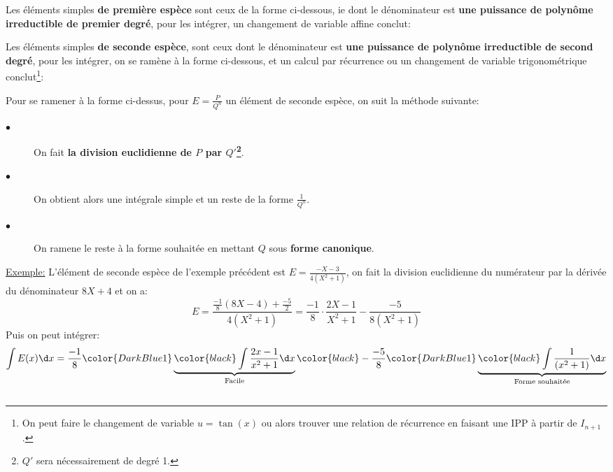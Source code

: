 Les éléments simples \textbf{de première espèce} sont ceux de la forme ci-dessous, ie dont le dénominateur est \textbf{une puissance de polynôme irreductible de premier degré}, pour les intégrer, un changement de variable affine conclut:

Les éléments simples \textbf{de seconde espèce}, sont ceux dont le dénominateur est \textbf{une puissance de polynôme irreductible de second degré}, pour les intégrer, on se ramène à la forme ci-dessous, et un calcul par récurrence ou un changement de variable trigonométrique conclut\footnote[1]{On peut faire le changement de variable \(u = \tan(x)\) ou alors trouver une relation de récurrence en faisant une IPP à partir de \(I_{n+1}\).}:

Pour se ramener à la forme ci-dessus, pour \(E = \frac{P}{Q^n}\) un élément de seconde espèce, on suit la méthode suivante:\+
\begin{description}
   \item[$\bullet$] On fait \textbf{la division euclidienne de \(P\) par \(Q'\)\footnote[2]{\(Q'\) sera nécessairement de degré 1.}}.
   \item[$\bullet$] On obtient alors une intégrale simple et un reste de la forme \(\frac{1}{Q^n}\).
   \item[$\bullet$] On ramene le reste à la forme souhaitée en mettant \(Q\) sous \textbf{forme canonique}.
\end{description}
\underline{Exemple:} L'élément de seconde espèce de l'exemple précédent est \(E = \frac{-X - 3}{4(X^2+1)}\), on fait la division euclidienne du numérateur par la dérivée du dénominateur \(8X + 4\) et on a:
\[
   E = \frac{\frac{-1}{8}(8X - 4) + \frac{-5}{2}}{4(X^2+1)} =  \frac{-1}{8} \cdot \frac{2X - 1}{X^2+1} - \frac{-5}{8(X^2 +1)}
\]
Puis on peut intégrer:
\[
   \int E(x) \d x = \frac{-1}{8}  \color{DarkBlue1}\underbrace{\color{black} \int \frac{2x - 1}{x^2+1} \d x}_\text{Facile}\color{black}  - \frac{-5}{8} \color{DarkBlue1}\underbrace{\color{black}\int \frac{1}{(x^2 +1)} \d x}_\text{Forme souhaitée}
\]

\subsection*{}

